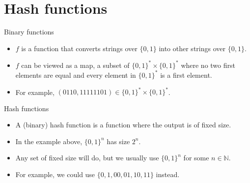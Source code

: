 \documentclass{beamer}
\begin{document}
\section{Hash functions}

\begin{frame}{Binary functions}

  \begin{itemize}
    \item $f$ is a function that converts strings over $\{0,1\}$ into other strings over $\{0,1\}$.
    \item $f$ can be viewed as a map, a subset of $\{0,1\}^* \times \{0,1\}^*$ where no two first elements are equal and every element in $\{0,1\}^*$ is a first element.
    \item For example, $(0110,11111101) \in \{0,1\}^* \times \{0,1\}^*$.
  \end{itemize}
\end{frame}


\begin{frame}{Hash functions}

  \begin{itemize}
    \item A (binary) hash function is a function where the output is of fixed size.
    \item In the example above, $\{0,1\}^n$ has size $2^n$.
    \item Any set of fixed size will do, but we usually use $\{0,1\}^n$ for some $n \in \mathbb{N}$.
    \item For example, we could use $\{0, 1, 00, 01, 10, 11\}$ instead.
  \end{itemize}
\end{frame}
\end{document}

